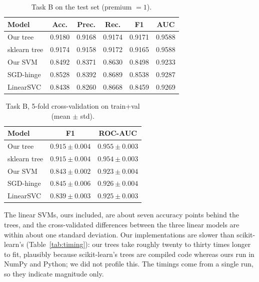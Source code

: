 \documentclass[10pt,twocolumn,a4paper]{article}
\begin{document}
\begin{table}[t]
  \centering
  \footnotesize
  \caption{Task B on the test set (premium $=1$).}
  \label{tab:testB}
  \begin{tabular}{@{}lccccc@{}}
    \toprule
    Model & Acc. & Prec. & Rec. & F1 & AUC \\
    \midrule
    Our tree     & 0.9180 & 0.9168 & 0.9174 & 0.9171 & 0.9588 \\
    sklearn tree & 0.9174 & 0.9158 & 0.9172 & 0.9165 & 0.9588 \\
    Our SVM      & 0.8492 & 0.8371 & 0.8630 & 0.8498 & 0.9233 \\
    SGD-hinge    & 0.8528 & 0.8392 & 0.8689 & 0.8538 & 0.9287 \\
    LinearSVC    & 0.8438 & 0.8260 & 0.8668 & 0.8459 & 0.9269 \\
    \bottomrule
  \end{tabular}
\end{table}

\begin{table}[t]
  \centering
  \footnotesize
  \caption{Task B, 5-fold cross-validation on train+val (mean $\pm$ std).}
  \label{tab:cv}
  \begin{tabular}{@{}lcc@{}}
    \toprule
    Model & F1 & ROC-AUC \\
    \midrule
    Our tree     & $0.915\pm0.004$ & $0.955\pm0.003$ \\
    sklearn tree & $0.915\pm0.004$ & $0.954\pm0.003$ \\
    Our SVM      & $0.843\pm0.002$ & $0.923\pm0.004$ \\
    SGD-hinge    & $0.845\pm0.006$ & $0.926\pm0.004$ \\
    LinearSVC    & $0.839\pm0.003$ & $0.925\pm0.003$ \\
    \bottomrule
  \end{tabular}
\end{table}

The linear SVMs, ours included, are about seven accuracy points behind the
trees, and the cross-validated differences between the three linear models are
within about one standard deviation. Our implementations are slower than
scikit-learn's (Table~\ref{tab:timing}): our trees take roughly twenty to thirty
times longer to fit, plausibly because scikit-learn's trees are compiled code
whereas ours run in NumPy and Python; we did not profile this. The timings come
from a single run, so they indicate magnitude only.
\end{document}
